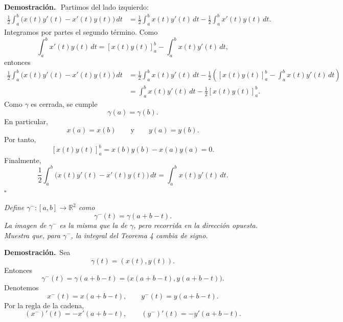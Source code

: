 \documentclass[11pt,letterpaper]{article}
\newcommand{\R}{\mathbb{R}}
\newcommand{\dt}{\,dt}
\begin{document}
\textbf{Demostración.}\,\
Partimos del lado izquierdo:
\begin{align*}
    \frac12\int_a^b\bigl(x(t)y'(t)-x'(t)y(t)\bigr)\dt
    &=\frac12\int_a^b x(t)y'(t)\dt
      -\frac12\int_a^b x'(t)y(t)\dt.
\end{align*}
Integramos por partes el segundo término. Como
\begin{equation*}
    \int_a^b x'(t)y(t)\dt
    =\left[x(t)y(t)\right]_a^b-\int_a^b x(t)y'(t)\dt,
\end{equation*}
entonces
\begin{align*}
    \frac12\int_a^b\bigl(x(t)y'(t)-x'(t)y(t)\bigr)\dt
    &=\frac12\int_a^b x(t)y'(t)\dt
    -\frac12\left(\left[x(t)y(t)\right]_a^b-\int_a^b x(t)y'(t)\dt\right) \\
    &=\int_a^b x(t)y'(t)\dt
    -\frac12\left[x(t)y(t)\right]_a^b.
\end{align*}
Como $\gamma$ es cerrada, se cumple
\begin{equation*}
    \gamma(a)=\gamma(b).
\end{equation*}
En particular,
\begin{equation*}
    x(a)=x(b)
    \qquad\text{y}\qquad
    y(a)=y(b).
\end{equation*}
Por tanto,
\begin{equation*}
    \left[x(t)y(t)\right]_a^b=x(b)y(b)-x(a)y(a)=0.
\end{equation*}
Finalmente,
\begin{equation*}
    \frac12\int_a^b\bigl(x(t)y'(t)-x'(t)y(t)\bigr)\dt
    =\int_a^b x(t)y'(t)\dt.
\end{equation*}
\hfill $\square$
\begin{tcolorbox}[title=\textcolor{white}{Problema 20}]
\textit{Define $\gamma^-:[a,b]\to\R^2$ como}
\begin{equation*}
    \gamma^-(t)=\gamma(a+b-t).
\end{equation*}
\textit{La imagen de $\gamma^-$ es la misma que la de $\gamma$, pero recorrida en la dirección opuesta. Muestra que, para $\gamma^-$, la integral del Teorema 4 cambia de signo.}
\end{tcolorbox}

\textbf{Demostración.}\,
Sea
\begin{equation*}
    \gamma(t)=(x(t),y(t)).
\end{equation*}
Entonces
\begin{equation*}
    \gamma^-(t)=\gamma(a+b-t)=\bigl(x(a+b-t),y(a+b-t)\bigr).
\end{equation*}
Denotemos
\begin{equation*}
    x^-(t)=x(a+b-t),
    \qquad
    y^-(t)=y(a+b-t).
\end{equation*}
Por la regla de la cadena,
\begin{equation*}
    (x^-)'(t)=-x'(a+b-t),
    \qquad
    (y^-)'(t)=-y'(a+b-t).
\end{equation*}
\end{document}
